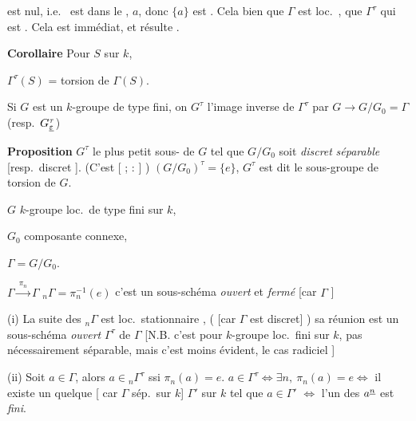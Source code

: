 \documentclass[11pt,a4paper]{article}
\begin{document}
est nul, i.e.\ \struck{\ill{}}  est dans le  \ill{} \ill{}, \ill{} $a$, donc $\{a\}$ est \ill{}. Cela \ill{} bien que $\Gamma$ est loc.\ , que \ill{} $\Gamma^\tau$ qui est \ill{} \ill{}. Cela est \ill{} immédiat, et résulte \ill{}  \ill{}.

 \textbf{Corollaire} \quad Pour \ill{} $S$ \struck{\ill{}} sur $k$, \add{\ill{}}

$\Gamma^\tau(S)$ = torsion de $\Gamma(S)$. 


Si $G$ est un \struck{\ill{}} $k$-groupe \ill{} de type fini, on \ill{} $G^\tau$ l'image inverse de \ill{} $\Gamma^\tau$ par $G \to G/G_0 = \Gamma$ (resp.\ $G^\tau_{\uncertain{\varepsilon}}$)

\textbf{Proposition} \quad $G^\tau$  le plus petit sous-\ill{} de $G$ tel que $G/G_0$ soit
\emph{discret} \emph{séparable} [resp.\ discret   ]. (C'est \ill{} \ill{} \ill{} \ill{} [\ill{} ; \ill{} : \ill{} \ill{}] \ill{} \ill{} \ill{} \ill{} \ill{})
$(G/G_0)^\tau = \{e\}$, \struck{\ill{}} $G^\tau$ est dit le sous-groupe de torsion de $G$.


$G$ $k$-groupe loc.\ de type fini sur $k$,

$G_0$ composante connexe,

$\Gamma = G/G_0$.

$\Gamma \xrightarrow{\ \pi_n\ } \Gamma$ \qquad ${}_n\Gamma = \pi_n^{-1}(e)$ \quad c'est un sous-schéma \emph{ouvert} et \emph{fermé} [car $\Gamma$  ] \ill{} \ill{} \ill{}

(i) La suite des ${}_n\Gamma$ est loc.\ stationnaire \ill{} \ill{}, \struck{\ill{}} ( [car $\Gamma$ est discret] \ill{} \ill{} \ill{}) sa réunion est un sous-schéma \emph{ouvert}  $\Gamma^\tau$ de $\Gamma$ [N.B. c'est  pour  $k$-groupe loc.\ fini sur $k$, pas nécessairement séparable, mais c'est moins évident, le cas radiciel \ill{} \ill{} \ill{} \ill{} \ill{} ]

(ii) Soit $a \in \Gamma$, alors $a \in {}_n\Gamma^\tau$ ssi  $\pi_n(a) = e$.
$a \in \Gamma^\tau \Leftrightarrow \exists n,\ \pi_n(a) = e \Leftrightarrow$ il existe un \ill{} 
 quelque \ill{} \ill{} [\ill{} \ill{} car $\Gamma$ sép.\ sur $k$]
$\Gamma'$  sur $k$ tel que $a \in \Gamma'$ $\Longleftrightarrow$ l'un des $a^{\uncertain{n}}$ est \emph{fini}.
\end{document}
